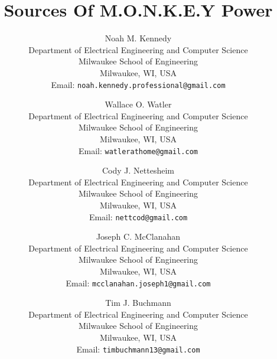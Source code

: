 \documentclass[8pt]{article}
\title{
    Sources Of M.O.N.K.E.Y Power
}
\author{
    Noah M. Kennedy \\[3pt]
    {\small Department of Electrical Engineering and Computer Science} \\
    {\small Milwaukee School of Engineering} \\
    {\small Milwaukee, WI, USA} \\
    {\small Email: {\texttt{noah.kennedy.professional@gmail.com} }} \\
    \and
    Wallace O. Watler \\[3pt]
    {\small Department of Electrical Engineering and Computer Science} \\
    {\small Milwaukee School of Engineering} \\
    {\small Milwaukee, WI, USA} \\
    {\small Email: {\texttt{watlerathome@gmail.com} }} \\
    \and
    Cody J. Nettesheim \\[3pt]
    {\small Department of Electrical Engineering and Computer Science} \\
    {\small Milwaukee School of Engineering} \\
    {\small Milwaukee, WI, USA} \\
    {\small Email: {\texttt{nettcod@gmail.com} }} \\
    \and
    Joseph C. McClanahan \\[3pt]
    {\small Department of Electrical Engineering and Computer Science} \\
    {\small Milwaukee School of Engineering} \\
    {\small Milwaukee, WI, USA} \\
    {\small Email: {\texttt{mcclanahan.joseph1@gmail.com} }} \\
    \and
    Tim J. Buchmann \\[3pt]
    {\small Department of Electrical Engineering and Computer Science} \\
    {\small Milwaukee School of Engineering} \\
    {\small Milwaukee, WI, USA} \\
    {\small Email: {\texttt{timbuchmann13@gmail.com} }}
}
\begin{document}
    \maketitle~\nocite{*}
    \newpage

    \printbibliography
\end{document}
